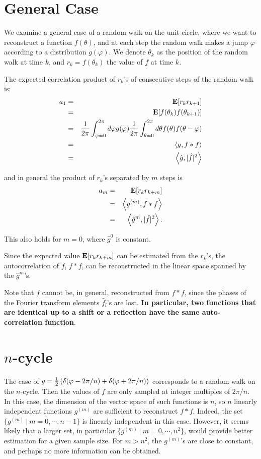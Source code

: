 \documentclass[11pt]{article} \usepackage{amssymb}
\newcommand{\E}{{\bf E}} \newcommand{\Cov}{{\bf Cov}}
\renewcommand{\phi}{\varphi}
\begin{document}
\section{General Case}
We examine a general case of a random walk on the unit circle, 
where we want to reconstruct a function $f(\theta)$, 
and at each step the random walk makes
a jump $\phi$ according to a distribution $g(\phi)$. We denote $\theta_k$ as the
position of the random walk at time $k$, and $r_k=f(\theta_k)$ the value
of $f$ at time $k$.  

The expected correlation product of $r_k$'s of consecutive steps of the random 
walk is:
\begin{eqnarray*}
  a_1&=&\E[r_kr_{k+1}]\\
     &=&\E[f(\theta_k)f(\theta_{k+1})]\\
     &=&{1\over 2\pi}\int_{\phi=0}^{2\pi}{d\phi g(\phi){1\over 2\pi}\int_{\theta=0}^{2\pi}{d\theta f(\theta)f(\theta-\phi)}}\\
     &=&\left<g,f*f\right>\\
     &=&\left<\hat{g},|\hat{f}|^2\right>
\end{eqnarray*}

and in general the product of $r_k$'s separated by $m$ steps is
\begin{eqnarray*}
  a_m&=&\E[r_kr_{k+m}]\\
     &=&\left<g^{(m)},f*f\right>\\
     &=&\left<\hat{g}^m,|\hat{f}|^2\right>.
\end{eqnarray*}

This also holds for $m=0$, where $\hat{g}^0$ is constant.

Since the expected value $\E[r_kr_{k+m}]$ can be estimated from the $r_k$'s,
the autocorrelation of $f$, $f*f$, can be reconstructed in the linear
space spanned by the $\hat{g}^m$'s.

Note that $f$ cannot be, in general, reconstructed from $f*f$, since the
phases of the Fourier transform elements $\hat{f}_l$'s are lost. 
{\bf In particular, two functions 
that are identical up to a shift or a reflection have the same 
auto-correlation function}.

\section{$n$-cycle}
The case of $g={1\over 2}\left(\delta(\phi-2\pi/n)+\delta(\phi+2\pi/n)\right)$ 
corresponds to
a random walk on the $n$-cycle. Then the values of $f$ are only sampled at
integer multiples of $2\pi/n$. In this case, the dimension of the vector
space of such functions is $n$, so $n$ linearly independent functions
$g^{(m)}$ are sufficient to reconstruct $f*f$. Indeed, the set
$\{g^{(m)}\:|\:m=0,\cdots,n-1\}$ is linearly independent in this case.
However, it seems likely that a larger set, in particular
$\{g^{(m)}\:|\:m=0,\cdots,n^2\}$, would provide better estimation
for a given sample size. For $m>n^2$, the $g^{(m)}$'s are close to constant,
and perhaps no more information can be obtained.
\end{document}
